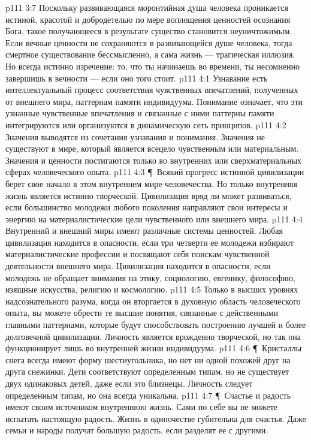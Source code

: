 \vs p111 3:7 Поскольку развивающаяся моронтийная душа человека проникается истиной, красотой и добродетелью по мере воплощения ценностей осознания Бога, такое получающееся в результате существо становится неуничтожимым. Если вечные ценности не сохраняются в развивающейся душе человека, тогда смертное существование бессмысленно, а сама жизнь --- трагическая иллюзия. Но всегда истинно изречение: то, что ты начинаешь во времени, ты несомненно завершишь в вечности --- если оно того стоит.
\vs p111 4:1 Узнавание есть интеллектуальный процесс соответствия чувственных впечатлений, полученных от внешнего мира, паттернам памяти индивидуума. Понимание означает, что эти узнанные чувственные впечатления и связанные с ними паттерны памяти интегрируются или организуются в динамическую сеть принципов.
\vs p111 4:2 Значения выводятся из сочетания узнавания и понимания. Значения не существуют в мире, который является всецело чувственным или материальным. Значения и ценности постигаются только во внутренних или сверхматериальных сферах человеческого опыта.
\vs p111 4:3 \P\ Всякий прогресс истинной цивилизации берет свое начало в этом внутреннем мире человечества. Но только внутренняя жизнь является истинно творческой. Цивилизация вряд ли может развиваться, если большинство молодежи любого поколения направляют свои интересы и энергию на материалистические цели чувственного или внешнего мира.
\vs p111 4:4 Внутренний и внешний миры имеют различные системы ценностей. Любая цивилизация находится в опасности, если три четверти ее молодежи избирают материалистические профессии и посвящают себя поискам чувственной деятельности внешнего мира. Цивилизация находится в опасности, если молодежь не обращает внимания на этику, социологию, евгенику, философию, изящные искусства, религию и космологию.
\vs p111 4:5 Только в высших уровнях надсознательного разума, когда он вторгается в духовную область человеческого опыта, вы можете обрести те высшие понятия, связанные с действенными главными паттернами, которые будут способствовать построению лучшей и более долговечной цивилизации. Личность является врожденно творческой, но так она функционирует лишь во внутренней жизни индивидуума.
\vs p111 4:6 \P\ Кристаллы снега всегда имеют форму шестиугольника, но нет ни одной похожей друг на друга снежинки. Дети соответствуют определенным типам, но не существует двух одинаковых детей, даже если это близнецы. Личность следует определенным типам, но она всегда уникальна.
\vs p111 4:7 \P\ Счастье и радость имеют своим источником внутреннюю жизнь. Сами по себе вы не можете испытать настоящую радость. Жизнь в одиночестве губительна для счастья. Даже семьи и народы получат большую радость, если разделят ее с другими.
